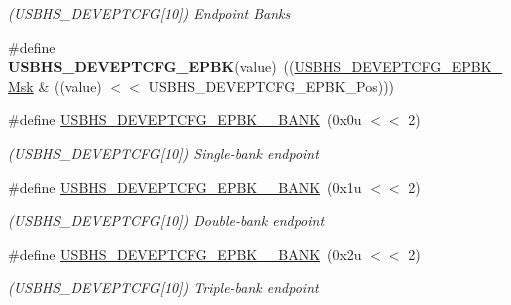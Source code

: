 \begin{DoxyCompactItemize}
\begin{DoxyCompactList}\small\item\em (U\+S\+B\+H\+S\+\_\+\+D\+E\+V\+E\+P\+T\+C\+FG\mbox{[}10\mbox{]}) Endpoint Banks \end{DoxyCompactList}\item 
\mbox{\label{group__SAMS70__USBHS_ga9bef4082a7cfc52ef17b3b669a605829}} 
\#define {\bfseries U\+S\+B\+H\+S\+\_\+\+D\+E\+V\+E\+P\+T\+C\+F\+G\+\_\+\+E\+P\+BK}(value)~((\mbox{\hyperlink{group__SAMV71__USBHS_ga21ff629a9b5ae6ea0e8255180ca92df3}{U\+S\+B\+H\+S\+\_\+\+D\+E\+V\+E\+P\+T\+C\+F\+G\+\_\+\+E\+P\+B\+K\+\_\+\+Msk}} \& ((value) $<$$<$ U\+S\+B\+H\+S\+\_\+\+D\+E\+V\+E\+P\+T\+C\+F\+G\+\_\+\+E\+P\+B\+K\+\_\+\+Pos)))
\item 
\mbox{\label{group__SAMS70__USBHS_gad917d30d65138878950a81c136360142}} 
\#define \mbox{\hyperlink{group__SAMS70__USBHS_gad917d30d65138878950a81c136360142}{U\+S\+B\+H\+S\+\_\+\+D\+E\+V\+E\+P\+T\+C\+F\+G\+\_\+\+E\+P\+B\+K\+\_\+\_\+\+B\+A\+NK}}~(0x0u $<$$<$ 2)
\begin{DoxyCompactList}\small\item\em (U\+S\+B\+H\+S\+\_\+\+D\+E\+V\+E\+P\+T\+C\+FG\mbox{[}10\mbox{]}) Single-\/bank endpoint \end{DoxyCompactList}\item 
\mbox{\label{group__SAMS70__USBHS_ga007501247a16b5f40536efe67c660458}} 
\#define \mbox{\hyperlink{group__SAMS70__USBHS_ga007501247a16b5f40536efe67c660458}{U\+S\+B\+H\+S\+\_\+\+D\+E\+V\+E\+P\+T\+C\+F\+G\+\_\+\+E\+P\+B\+K\+\_\+\_\+\+B\+A\+NK}}~(0x1u $<$$<$ 2)
\begin{DoxyCompactList}\small\item\em (U\+S\+B\+H\+S\+\_\+\+D\+E\+V\+E\+P\+T\+C\+FG\mbox{[}10\mbox{]}) Double-\/bank endpoint \end{DoxyCompactList}\item 
\mbox{\label{group__SAMS70__USBHS_gaacf793331bc0eb223c5ed1a5e8712165}} 
\#define \mbox{\hyperlink{group__SAMS70__USBHS_gaacf793331bc0eb223c5ed1a5e8712165}{U\+S\+B\+H\+S\+\_\+\+D\+E\+V\+E\+P\+T\+C\+F\+G\+\_\+\+E\+P\+B\+K\+\_\+\_\+\+B\+A\+NK}}~(0x2u $<$$<$ 2)
\begin{DoxyCompactList}\small\item\em (U\+S\+B\+H\+S\+\_\+\+D\+E\+V\+E\+P\+T\+C\+FG\mbox{[}10\mbox{]}) Triple-\/bank endpoint \end{DoxyCompactList}\item 

\end{DoxyCompactItemize}
